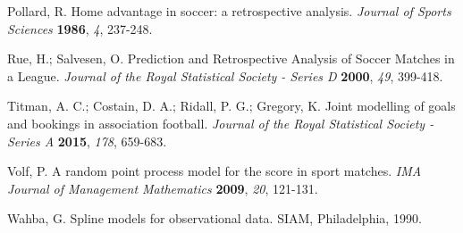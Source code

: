 \documentclass[journal,article,accept,moreauthors,pdftex,12pt,a4paper]{mdpi}
\begin{document}
\begin{thebibliography}{999}
Pollard, R. Home advantage in soccer: a retrospective analysis. {\em Journal of Sports Sciences} {\bf 1986}, {\em 4}, 237-248.

Rue, H.; Salvesen, O. Prediction and Retrospective Analysis of
Soccer Matches in a League. {\em Journal of the Royal Statistical
Society - Series D} {\bf 2000}, {\em 49}, 399-418.

Titman, A. C.; Costain, D. A.; Ridall, P. G.; Gregory, K. Joint
modelling of goals and bookings in association football. {\em
Journal of the Royal Statistical Society - Series A} {\bf 2015},
{\em 178}, 659-683.

Volf, P. A random point process model for the score in sport
matches. {\em IMA Journal of Management Mathematics} {\bf 2009},
{\em 20}, 121-131.

Wahba, G. Spline models for observational data. SIAM, Philadelphia,
1990.

\end{thebibliography}

%
%


%


%
\end{document}
